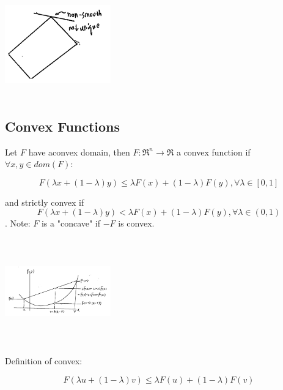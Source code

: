 \begin{enumerate}
	\begin{marginfigure}
	\centering
	\includegraphics[width=1.8in,height=1.8in]{figures/ch08/figure1030_5.png}
	\end{marginfigure}
\end{enumerate}

\subsection{Convex Functions}
Let $F$ have aconvex domain, then $F:\Re^n\rightarrow \Re$ a convex function if $\forall x,y \in dom(F)$:

\begin{equation*}
F(\lambda x + (1-\lambda)y) \leq \lambda F(x) + (1-\lambda)F(y), \forall \lambda \in [0,1]
\end{equation*}

and strictly convex if 
\begin{equation*}
F(\lambda x + (1-\lambda)y) < \lambda F(x) + (1-\lambda)F(y), \forall \lambda \in (0,1)
\end{equation*}
.
Note: $F$ is a "concave" if $-F$ is convex.

\begin{marginfigure}
	\centering
	\includegraphics[width=1.8in,height=1.8in]{figures/ch08/figure1030_6.png}
\end{marginfigure}

Definition of convex:

\begin{equation*}
F(\lambda u + (1-\lambda)v) \leq \lambda F(u) + (1-\lambda)F(v)
\end{equation*}


